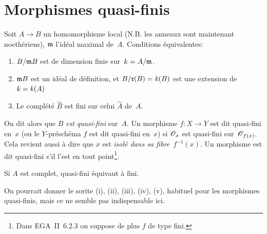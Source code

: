 \section{Morphismes quasi-finis}
\label{I.2}
\begin{proposition}
\label{I.2.1}
Soit $A\to B$ un homomorphisme local (N.B. les anneaux sont maintenant
noeth\'eriens), $\mathfrak{m}$ l'id\'eal maximal de~$A$. Conditions
\'equivalentes:
\begin{enumerate}
\item[(i)] $B/\mathfrak{m}B$ est de dimension finie sur~$k=A/\mathfrak{m}$.
\item[(ii)] $\mathfrak{m}B$ est un id\'eal de d\'efinition, et $B/\mathfrak{r}(B)=\mathit{k}(B)$ est une extension de~$k=\mathit{k}(A)$
\item[(iii)] Le compl\'et\'e $\widehat{B}$ est fini sur celui
$\widehat{A}$ de~$A$.
\end{enumerate}
\end{proposition}
On dit alors
que $B$ \emph{est quasi-fini}
sur~$A$. Un morphisme $f\colon X\to Y$
est dit quasi-fini en~$x$ (ou le $Y$-pr\'esch\'ema $f$ est dit
quasi-fini en~$x$) si $\cal{O}_x$ est quasi-fini
sur~$\cal{O}_{f(x)}$. Cela revient aussi \`a dire que $x$ est
\emph{isolé dans sa fibre}~$f^{-1}(x)$. Un morphisme est dit
quasi-fini s'il l'est en tout point\footnote{Dans EGA~II~6.2.3 on
suppose de plus $f$ de type fini.}.
\begin{corollaire}
\label{I.2.2}
Si $A$ est complet, quasi-fini \'equivaut \`a fini.

\end{corollaire}

On pourrait donner le sorite \textup{(i), (ii), (iii), (iv), (v),} habituel pour les morphismes quasi-finis, mais ce ne semble pas indispensable ici.

